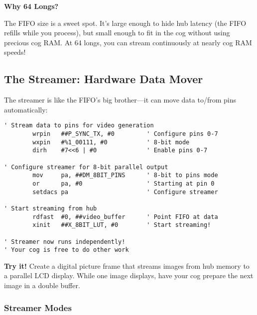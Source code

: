 \documentclass[11pt]{book}
\begin{document}
\begin{sidetrack}
\textbf{Why 64 Longs?}

The FIFO size is a sweet spot. It's large enough to hide hub latency (the FIFO refills while you process), but small enough to fit in the cog without using precious cog RAM. At 64 longs, you can stream continuously at nearly cog RAM speeds!
\end{sidetrack}

\hypertarget{the-streamer-hardware-data-mover}{%
\subsection{The Streamer: Hardware Data
Mover}\label{the-streamer-hardware-data-mover}}

The streamer is like the FIFO's big brother---it can move data to/from
pins automatically:

\begin{lstlisting}
' Stream data to pins for video generation
        wrpin   ##P_SYNC_TX, #0         ' Configure pins 0-7
        wxpin   #%1_00111, #0           ' 8-bit mode
        dirh    #7<<6 | #0              ' Enable pins 0-7
        
' Configure streamer for 8-bit parallel output
        mov     pa, ##DM_8BIT_PINS      ' 8-bit to pins mode
        or      pa, #0                  ' Starting at pin 0
        setdacs pa                      ' Configure streamer
        
' Start streaming from hub
        rdfast  #0, ##video_buffer      ' Point FIFO at data
        xinit   ##X_8BIT_LUT, #0        ' Start streaming!
        
' Streamer now runs independently!
' Your cog is free to do other work
\end{lstlisting}

\textbf{Try it!} Create a digital picture frame that streams images from
hub memory to a parallel LCD display. While one image displays, have
your cog prepare the next image in a double buffer.

\hypertarget{streamer-modes}{%
\subsubsection{Streamer Modes}\label{streamer-modes}}
\end{document}
